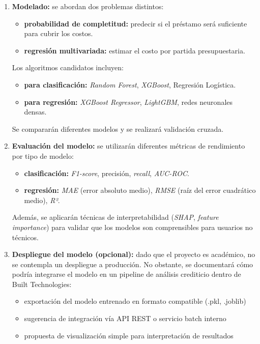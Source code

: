 \documentclass[
11pt, %
]{charter}
\begin{document}
\begin{enumerate}
  \item \textbf{Modelado:}  
  se abordan dos problemas distintos:
  \begin{itemize}
    \item \textbf{probabilidad de completitud:} predecir si el préstamo será suficiente para cubrir los costos.
    \item \textbf{regresión multivariada:} estimar el costo por partida presupuestaria.
  \end{itemize}
  Los algoritmos candidatos incluyen:
  \begin{itemize}
    \item \textbf{para clasificación:} \textit{Random Forest}, \textit{XGBoost}, Regresión Logística.
    \item \textbf{para regresión:} \textit{XGBoost Regressor}, \textit{LightGBM}, redes neuronales densas.
  \end{itemize}
  Se compararán diferentes modelos y se realizará validación cruzada.

  \item \textbf{Evaluación del modelo:}  
  se utilizarán diferentes métricas de rendimiento por tipo de modelo:
  \begin{itemize}
    \item \textbf{clasificación:} \textit{F1-score}, precisión, \textit{recall}, \textit{AUC-ROC}.
    \item \textbf{regresión:} \textit{MAE} (error absoluto medio), \textit{RMSE} (raíz del error cuadrático medio), \textit{R²}.
  \end{itemize}
  Además, se aplicarán técnicas de interpretabilidad (\textit{SHAP}, \textit{feature importance}) para validar que los modelos son comprensibles para usuarios no técnicos.

  \item \textbf{Despliegue del modelo (opcional):}  
  dado que el proyecto es académico, no se contempla un despliegue a producción.  
  No obstante, se documentará cómo podría integrarse el modelo en un pipeline de análisis crediticio dentro de Built Technologies:
  \begin{itemize}
    \item exportación del modelo entrenado en formato compatible (.pkl, .joblib)
    \item sugerencia de integración vía API REST o servicio batch interno
    \item propuesta de visualización simple para interpretación de resultados
  \end{itemize}
\end{enumerate}
\end{document}
